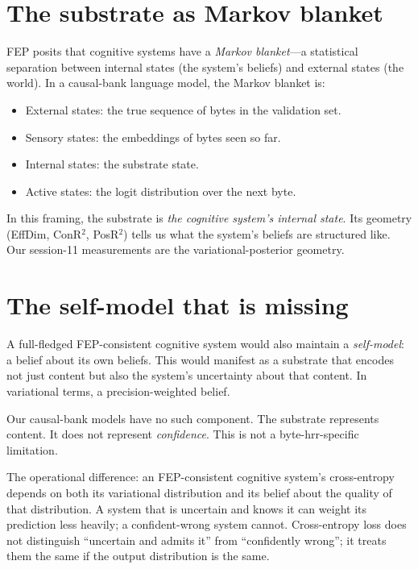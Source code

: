 \documentclass[11pt,openany]{book}
\begin{document}
\section{The substrate as Markov blanket}

FEP posits that cognitive systems have a \emph{Markov blanket}---a
statistical separation between internal states (the system's beliefs)
and external states (the world). In a causal-bank language model, the
Markov blanket is:

\begin{itemize}
  \item External states: the true sequence of bytes in the validation
  set.
  \item Sensory states: the embeddings of bytes seen so far.
  \item Internal states: the substrate state.
  \item Active states: the logit distribution over the next byte.
\end{itemize}

In this framing, the substrate is \emph{the cognitive system's internal
state}. Its geometry (EffDim, ConR$^2$, PosR$^2$) tells us what
the system's beliefs are structured like. Our session-11 measurements
are the variational-posterior geometry.

\section{The self-model that is missing}

A full-fledged FEP-consistent cognitive system would also maintain a
\emph{self-model}: a belief about its own beliefs. This would
manifest as a substrate that encodes not just content but also the
system's uncertainty about that content. In variational terms, a
precision-weighted belief.

Our causal-bank models have no such component. The substrate
represents content. It does not represent \emph{confidence}. This is
not a byte-hrr-specific limitation.

The operational difference: an FEP-consistent cognitive system's
cross-entropy depends on both its variational distribution and its
belief about the quality of that distribution. A system that is
uncertain and knows it can weight its prediction less heavily; a
confident-wrong system cannot. Cross-entropy loss does not distinguish
``uncertain and admits it'' from ``confidently wrong''; it treats
them the same if the output distribution is the same.
\end{document}
